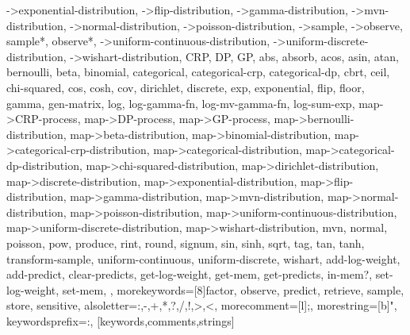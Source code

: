 {{    ->exponential-distribution, ->flip-distribution, ->gamma-distribution, %
    ->mvn-distribution, ->normal-distribution, ->poisson-distribution, %
    ->sample, ->observe, sample*, observe*, %
    ->uniform-continuous-distribution, ->uniform-discrete-distribution, %
    ->wishart-distribution, CRP, DP, GP, abs, absorb, acos, asin, atan, %
    bernoulli, beta, binomial, categorical, categorical-crp, categorical-dp, %
    cbrt, ceil, chi-squared, cos, cosh, cov, dirichlet, discrete, exp, %
    exponential, flip, floor, gamma, gen-matrix, log, log-gamma-fn, %
    log-mv-gamma-fn, log-sum-exp, map->CRP-process, map->DP-process, %
    map->GP-process, map->bernoulli-distribution, map->beta-distribution, %
    map->binomial-distribution, map->categorical-crp-distribution, %
    map->categorical-distribution, map->categorical-dp-distribution, %
    map->chi-squared-distribution, map->dirichlet-distribution, %
    map->discrete-distribution, map->exponential-distribution, %
    map->flip-distribution, map->gamma-distribution, map->mvn-distribution, %
    map->normal-distribution, map->poisson-distribution, %
    map->uniform-continuous-distribution, map->uniform-discrete-distribution, %
    map->wishart-distribution, mvn, normal, poisson, pow, produce, %
    rint, round, signum, sin, sinh, sqrt, tag, tan, tanh, transform-sample, %
    uniform-continuous, uniform-discrete, wishart, %
    add-log-weight, add-predict, clear-predicts, get-log-weight, %
    get-mem, get-predicts, in-mem?, set-log-weight, set-mem, %
  }, %
  morekeywords=[8]{factor, observe, predict, retrieve, sample, store}, %
  sensitive, %
  alsoletter={:,-,+,*,?,/,!,>,<}, %
  morecomment=[l];, %
  morestring=[b]", %
  keywordsprefix=:, %
}[keywords,comments,strings]
 
